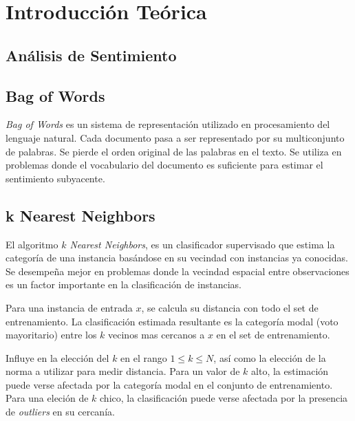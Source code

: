 \section{Introducción Teórica}%
\label{sec:introduccion_teorica}

\subsection{Análisis de Sentimiento}%
\label{sub:analisis_de_sentimiento}

\subsection{Bag of Words}%
\label{sub:bag_of_words}

\textit{Bag of Words} es un sistema de representación utilizado en
procesamiento del lenguaje natural. Cada documento pasa a ser representado por
su multiconjunto de palabras. Se pierde el orden original de las palabras en el
texto. Se utiliza en problemas donde el vocabulario del documento es suficiente
para estimar el sentimiento subyacente.



\subsection{k Nearest Neighbors}%
\label{sub:k_nearest_neighbors}

El algoritmo \textit{$k$ Nearest Neighbors}, \knn{} es un clasificador
supervisado que estima la categoría de una instancia basándose en su vecindad
con instancias ya conocidas.
Se desempeña mejor en problemas donde la vecindad espacial entre
observaciones es un factor importante en la clasificación de instancias.

Para una instancia de entrada $x$, se calcula su distancia con todo el set de
entrenamiento. La clasificación estimada resultante es la categoría modal (voto
mayoritario) entre los $k$ vecinos mas cercanos a $x$ en el set de
entrenamiento.

Influye en \knn{} la elección del $k$ en el rango $1 \leq k \leq N$, así como
la elección de la norma a utilizar para medir distancia.
Para un valor de $k$ alto, la estimación puede verse afectada por la categoría
modal en el conjunto de entrenamiento.
Para una eleción de $k$ chico, la clasificación puede verse afectada por la
presencia de \textit{outliers} en su cercanía.

